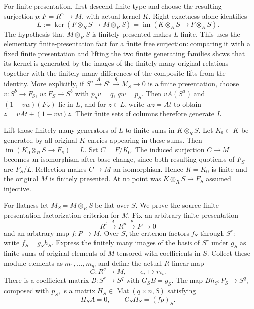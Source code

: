 For finite presentation, first descend finite type and choose the resulting surjection \(p:F=R^n\to M\), with actual kernel \(K\). Right exactness alone identifies \[
L:=\ker(F\otimes_RS\to M\otimes_RS)
=\operatorname{im}(K\otimes_RS\to F\otimes_RS).
\] The hypothesis that \(M\otimes_RS\) is finitely presented makes \(L\) finite. This uses the elementary finite-presentation fact for a finite free surjection: comparing it with a fixed finite presentation and lifting the two finite generating families shows that its kernel is generated by the images of the finitely many original relations together with the finitely many differences of the composite lifts from the identity. More explicitly, if \(S^a\xrightarrow{A}S^b\xrightarrow{q}M_S\to0\) is a finite presentation, choose \(v:S^b\to F_S\), \(w:F_S\to S^b\) with \(p_Sv=q\), \(qw=p_S\). Then \(vA(S^a)\) and \((1-vw)(F_S)\) lie in \(L\), and for \(z\in L\), write \(wz=A t\) to obtain \(z=vAt+(1-vw)z\). Their finite sets of columns therefore generate \(L\).

Lift those finitely many generators of \(L\) to finite sums in \(K\otimes_RS\). Let \(K_0\subset K\) be generated by all original \(K\)-entries appearing in these sums. Then \(\operatorname{im}(K_0\otimes_RS\to F_S)=L\). Set \(C=F/K_0\). The induced surjection \(C\to M\) becomes an isomorphism after base change, since both resulting quotients of \(F_S\) are \(F_S/L\). Reflection makes \(C\to M\) an isomorphism. Hence \(K=K_0\) is finite and the original \(M\) is finitely presented. At no point was \(K\otimes_RS\to F_S\) assumed injective.

For flatness let \(M_S=M\otimes_RS\) be flat over \(S\). We prove the source finite-presentation factorization criterion for \(M\). Fix an arbitrary finite presentation \[
R^t\xrightarrow{A}R^n\xrightarrow{p}P\to0
\] and an arbitrary map \(f:P\to M\). Over \(S\), the criterion factors \(f_S\) through \(S^r\): write \(f_S=g_Sh_S\). Express the finitely many images of the basis of \(S^r\) under \(g_S\) as finite sums of original elements of \(M\) tensored with coefficients in \(S\). Collect these module elements as \(m_1,\ldots,m_q\), and define the actual \(R\)-linear map \[
G:R^q\to M,\qquad e_i\mapsto m_i.
\] There is a coefficient matrix \(B:S^r\to S^q\) with \(G_SB=g_S\). The map \(Bh_S:P_S\to S^q\), composed with \(p_S\), is a matrix \(H_S\in\operatorname{Mat}(q\times n,S)\) satisfying \[
H_SA=0,\qquad G_SH_S=(fp)_S.
\]

